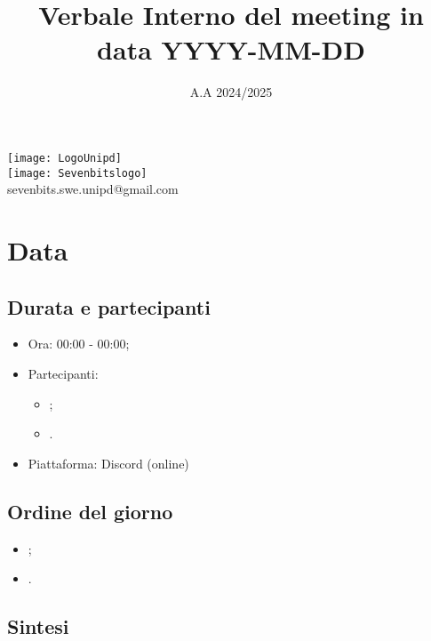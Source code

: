 \documentclass[10pt]{article}
\title{Verbale Interno del meeting in data YYYY-MM-DD} %
\date{A.A 2024/2025}
\begin{document}
\maketitle
\center 
\texttt{[image: LogoUnipd]}\\
\texttt{[image: Sevenbitslogo]}\\
sevenbits.swe.unipd@gmail.com\\
\vspace{2mm}

\newpage
\raggedright
\tableofcontents
\newpage

\section{Data} %
\subsection{Durata e partecipanti}
\begin{itemize}
\item Ora: 00:00 - 00:00; %
\item Partecipanti: 	
        \begin{itemize}
            \item ;
            \item .
        \end{itemize}
\item Piattaforma: Discord (online)
\end{itemize}

\subsection{Ordine del giorno}
\begin{itemize}
    \item ;
    \item .
\end{itemize}

\subsection{Sintesi}
\end{document}
